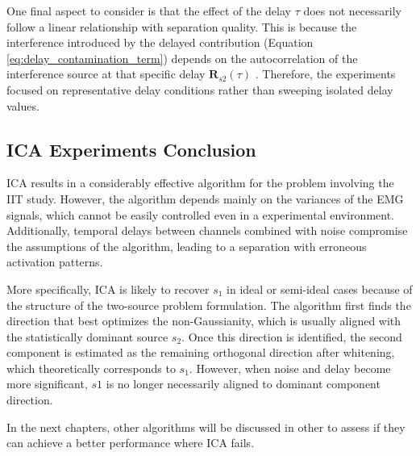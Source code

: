 One final aspect to consider is that the effect of the delay $\tau$ does not necessarily follow a linear relationship with separation quality. This is because the interference introduced by the delayed contribution (Equation \ref{eq:delay_contamination_term}) depends on the autocorrelation of the interference source at that specific delay $\mathbf{R}_{s2}(\tau)$ . Therefore, the experiments focused on representative delay conditions rather than sweeping isolated delay values.

\subsection{ICA Experiments Conclusion}

ICA results in a considerably effective algorithm for the problem involving the IIT study. However, the algorithm depends mainly on the variances of the EMG signals, which cannot be easily controlled even in a experimental environment. Additionally, temporal delays between channels combined with noise compromise the assumptions of the algorithm, leading to a separation with erroneous activation patterns.

More specifically, ICA is likely to recover $s_1$
in ideal or semi-ideal cases because of the structure of the two-source problem formulation. The algorithm first finds the direction that best optimizes the non-Gaussianity, which is usually aligned with the statistically dominant source $s_2$. Once this direction is identified, the second component is estimated as the remaining orthogonal direction after whitening, which theoretically corresponds to $s_1$. However, when noise and delay become more significant, $s1$ is no longer necessarily aligned to dominant component direction. 
 

In the next chapters, other algorithms will be discussed in other to assess if they can achieve a better performance where ICA fails.